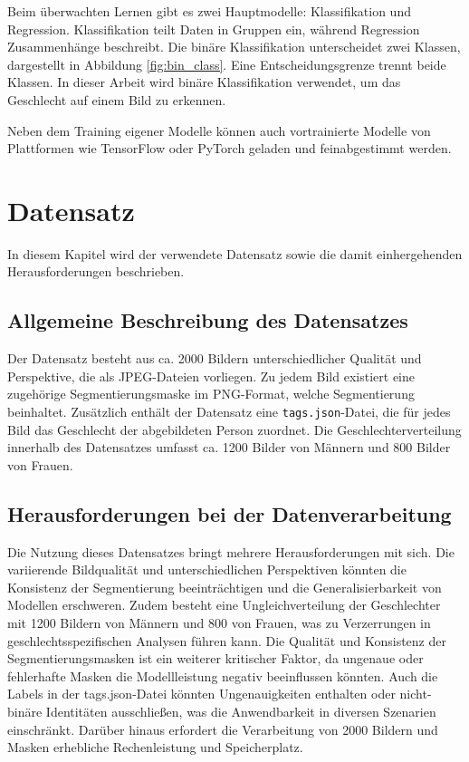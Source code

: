 \documentclass[journal,twoside,web]{ieeecolor}
\begin{document}
Beim überwachten Lernen gibt es zwei Hauptmodelle: Klassifikation und Regression. Klassifikation teilt Daten in Gruppen ein, während Regression Zusammenhänge beschreibt. Die binäre Klassifikation unterscheidet zwei Klassen, dargestellt in Abbildung \ref{fig:bin_class}. Eine Entscheidungsgrenze trennt beide Klassen. In dieser Arbeit wird binäre Klassifikation verwendet, um das Geschlecht auf einem Bild zu erkennen.

Neben dem Training eigener Modelle können auch vortrainierte Modelle von Plattformen wie TensorFlow oder PyTorch geladen und feinabgestimmt werden.


\section{Datensatz} 
\label{sec:dataset}
In diesem Kapitel wird der verwendete Datensatz sowie die damit einhergehenden Herausforderungen beschrieben.

\subsection{Allgemeine Beschreibung des Datensatzes}
\label{sec:dataset_description}
Der Datensatz besteht aus ca. 2000 Bildern unterschiedlicher Qualität und Perspektive, die als JPEG-Dateien vorliegen. Zu jedem Bild existiert eine zugehörige Segmentierungsmaske im PNG-Format, welche Segmentierung beinhaltet. Zusätzlich enthält der Datensatz eine \texttt{tags.json}-Datei, die für jedes Bild das Geschlecht der abgebildeten Person zuordnet. Die Geschlechterverteilung innerhalb des Datensatzes umfasst ca. 1200 Bilder von Männern und 800 Bilder von Frauen.

\subsection{Herausforderungen bei der Datenverarbeitung}  
Die Nutzung dieses Datensatzes bringt mehrere Herausforderungen mit sich. Die variierende Bildqualität und unterschiedlichen Perspektiven könnten die Konsistenz der Segmentierung beeinträchtigen und die Generalisierbarkeit von Modellen erschweren. Zudem besteht eine Ungleichverteilung der Geschlechter mit 1200 Bildern von Männern und 800 von Frauen, was zu Verzerrungen in geschlechtsspezifischen Analysen führen kann. Die Qualität und Konsistenz der Segmentierungsmasken ist ein weiterer kritischer Faktor, da ungenaue oder fehlerhafte Masken die Modellleistung negativ beeinflussen könnten. Auch die Labels in der tags.json-Datei könnten Ungenauigkeiten enthalten oder nicht-binäre Identitäten ausschließen, was die Anwendbarkeit in diversen Szenarien einschränkt. Darüber hinaus erfordert die Verarbeitung von 2000 Bildern und Masken erhebliche Rechenleistung und Speicherplatz. 
\end{document}
